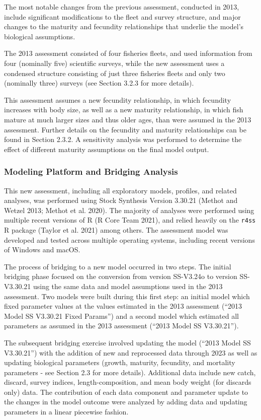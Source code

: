 \documentclass[11pt,
  letterpaper,
]{article}
\begin{document}
The most notable changes from the previous assessment, conducted in 2013, include significant modifications to the fleet and survey structure, and major changes to the maturity and fecundity relationships that underlie the model's biological assumptions.

The 2013 assessment consisted of four fisheries fleets, and used information from four (nominally five) scientific surveys, while the new assessment uses a condensed structure consisting of just three fisheries fleets and only two (nominally three) surveys (see Section 3.2.3 for more details).

This assessment assumes a new fecundity relationship, in which fecundity increases with body size, as well as a new maturity relationship, in which fish mature at much larger sizes and thus older ages, than were assumed in the 2013 assessment. Further details on the fecundity and maturity relationships can be found in Section 2.3.2. A sensitivity analysis was performed to determine the effect of different maturity assumptions on the final model output.

\hypertarget{modeling-platform-and-bridging-analysis}{%
\subsubsection{Modeling Platform and Bridging Analysis}\label{modeling-platform-and-bridging-analysis}}

This new assessment, including all exploratory models, profiles, and related analyses, was performed using Stock Synthesis Version 3.30.21 (Methot and Wetzel 2013; Methot et al. 2020). The majority of analyses were performed using multiple recent versions of R (R Core Team 2021), and relied heavily on the \texttt{r4ss} R package (Taylor et al. 2021) among others. The assessment model was developed and tested across multiple operating systems, including recent versions of Windows and macOS.

The process of bridging to a new model occurred in two steps. The initial bridging phase focused on the conversion from version SS-V3.24o to version SS-V3.30.21 using the same data and model assumptions used in the 2013 assessment. Two models were built during this first step: an initial model which fixed parameter values at the values estimated in the 2013 assessment (``2013 Model SS V3.30.21 Fixed Params'') and a second model which estimated all parameters as assumed in the 2013 assessment (``2013 Model SS V3.30.21'').

The subsequent bridging exercise involved updating the model (``2013 Model SS V3.30.21'') with the addition of new and reprocessed data through 2023 as well as updating biological parameters (growth, maturity, fecundity, and mortality parameters - see Section 2.3 for more details). Additional data include new catch, discard, survey indices, length-composition, and mean body weight (for discards only) data. The contribution of each data component and parameter update to the changes in the model outcome were analyzed by adding data and updating parameters in a linear piecewise fashion.
\end{document}
